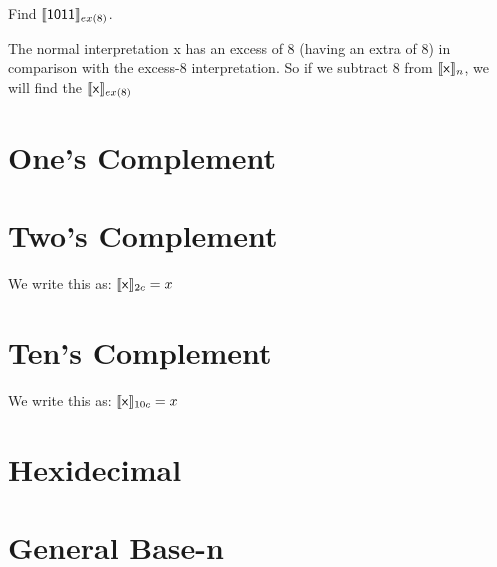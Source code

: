 \frmrule 

\begin{example}
Find $\llbracket \text{\textsf{1011}} \rrbracket_{ex(8)}$.
\end{example}


The normal interpretation \textsf{x} has an excess of 8 (having an extra of 8) 
in comparison with the excess-8 interpretation. 
So if we subtract 8 from $\llbracket \text{\textsf{x}} \rrbracket_{n}$, 
we will find the $\llbracket \text{\textsf{x}} \rrbracket_{ex(8)}$


\section{One's Complement}


\section{Two's Complement}

We write this as: $\llbracket \text{\textsf{x}} \rrbracket_{2c} = x$








\section{Ten's Complement}

We write this as: $\llbracket \text{\textsf{x}} \rrbracket_{10c} = x$


\section{Hexidecimal}


\section{General Base-n}

